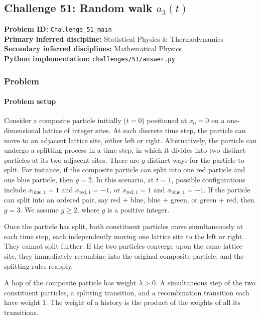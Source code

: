 \subsection[Challenge 51: Random walk a\_3(t)]{Challenge 51: Random walk $a_3(t)$}
\textbf{Problem ID:} \texttt{Challenge\_51\_main}\\
\textbf{Primary inferred discipline:} Statistical Physics \& Thermodynamics\\
\textbf{Secondary inferred disciplines:} Mathematical Physics\\
\textbf{Python implementation:} \texttt{challenges/51/answer.py}

\subsubsection*{Problem}
\paragraph*{Problem setup}
Consider a composite particle initially ($t = 0$) positioned at $x_0 = 0$ on a one-dimensional lattice of integer sites.
At each discrete time step, the particle can move to an adjacent lattice site, either left or right.
Alternatively, the particle can undergo a splitting process in a time step, in which it divides into two distinct particles at its two adjacent sites.
There are $g$ distinct ways for the particle to split.
For instance, if the composite particle can split into one red particle and one blue particle, then $g = 2$.
In this scenario, at $t = 1$, possible configurations include $x_{\text{blue}, 1} = 1$ and $x_{\text{red}, 1} = -1$, or $x_{\text{red}, 1} = 1$ and $x_{\text{blue}, 1} = -1$.
If the particle can split into an ordered pair, say red + blue, blue + green, or green + red, then $g = 3$.
We assume $g \geq 2$, where $g$ is a positive integer.

Once the particle has split, both constituent particles move simultaneously at each time step, each independently moving one lattice site to the left or right. They cannot split further.
If the two particles converge upon the same lattice site, they immediately recombine into the original composite particle, and the splitting rules reapply.

A hop of the composite particle has weight $\lambda>0$.
A simultaneous step of the two constituent particles, a splitting transition, and a recombination transition each have weight $1$.
The weight of a history is the product of the weights of all its transitions.

